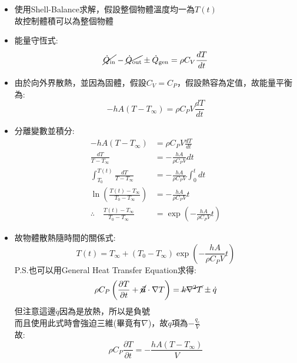 \documentclass[../main.tex]{subfiles}
\begin{document}
\begin{itemize}
  \begin{itemize}
    \item 使用Shell-Balance求解，假設整個物體溫度均一為$T(t)$\\
      故控制體積可以為整個物體
    \item 能量守恆式:
      \begin{equation}
        \cancel{ \dot{Q}_\text{in} }- \cancel{\dot{Q}_\text{out}} \pm \dot{Q}_\text{gen} = \rho C_V \frac{dT}{dt}
      \end{equation}
    \item 由於向外界散熱，並因為固體，假設$C_V=C_P$，假設熱容為定值，故能量平衡為:
      \begin{equation}
        -hA(T-T_{\infty}) =\rho C_P V \frac{dT}{dt}
      \end{equation}
    \item 分離變數並積分:
    \begin{align}
      -hA(T-T_{\infty}) &=\rho C_P V \frac{dT}{dt} \nonumber\\
      \frac{dT}{T-T_{\infty}} &= -\frac{hA}{\rho C_P V} dt \nonumber\\
      \int_{T_0}^{T(t)} \frac{dT}{T-T_{\infty}} &= -\frac{hA}{\rho C_P V} \int_0^t dt \nonumber\\
      \ln\left(\frac{T(t)-T_{\infty}}{T_0 - T_{\infty}}\right) &= -\frac{hA}{\rho C_P V} t \nonumber\\
      \therefore \quad \frac{T(t)-T_{\infty}}{T_0 - T_{\infty}} &= \exp\left(-\frac{hA}{\rho C_P V} t\right) \label{eq:heat_transfer_unsteady_lump_capacitance_model}
    \end{align}
    \item 故物體散熱隨時間的關係式:
    \begin{equation}
      \boxed{
        T(t) = T_{\infty} + (T_0 - T_{\infty}) \exp\left(-\frac{hA}{\rho C_P V} t\right)
      }
    \end{equation}
    P.S.也可以用General Heat Transfer Equation求得:
    \begin{equation}
      \rho C_P\left(\frac{\partial T}{\partial t}+\cancel{\vec{\bm u}}\cdot\nabla T\right) = \cancel{k\nabla^2T} \pm \dot{q}
    \end{equation}
    但注意這邊$\dot{q}$因為是放熱，所以是負號\\
    而且使用此式時會強迫三維(畢竟有$\nabla$)，故$\dot q$項為$-\frac{q_c}{V}$\\
    故:
    \begin{equation}
      \rho C_P \frac{\partial T}{\partial t} = -\frac{hA(T-T_{\infty})}{V}

\end{equation}
\end{itemize}
\end{itemize}
\end{document}
